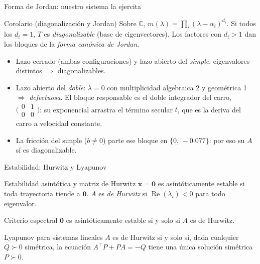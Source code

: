 \documentclass[aspectratio=169,11pt]{beamer}
\DeclareMathOperator{\Real}{Re}
\newcommand{\Cx}{\mathbb{C}}
\newcommand{\xv}{\bm{x}}
\begin{document}
\begin{frame}{Forma de Jordan: nuestro sistema la ejercita}
  \begin{cajares}{Corolario (diagonalizaci\'on y Jordan)}
    Sobre $\Cx$, $m(\lambda)=\prod_i(\lambda-\alpha_i)^{d_i}$. Si todos los
    $d_i=1$, $T$ es \emph{diagonalizable} (base de eigenvectores). Los factores
    con $d_i>1$ dan los bloques de la \emph{forma can\'onica de Jordan}.
  \end{cajares}
  \begin{itemize}
    \small
    \item Lazo cerrado (ambas configuraciones) y lazo abierto del \emph{simple}:
          eigenvalores distintos $\Rightarrow$ diagonalizables.
    \item Lazo abierto del \emph{doble}: $\lambda=0$ con multiplicidad
          algebraica 2 y geom\'etrica 1 $\Rightarrow$ \emph{defectuosa}. El bloque
          responsable es el doble integrador del carro,
          $\bigl(\begin{smallmatrix}0&1\\0&0\end{smallmatrix}\bigr)$:
          su exponencial arrastra el t\'ermino secular $t$, que es la deriva del
          carro a velocidad constante.
    \item La fricci\'on del simple ($b\neq0$) parte ese bloque en
          $\{0,\,-0.077\}$: por eso su $A$ s\'i es diagonalizable.
  \end{itemize}
\end{frame}

\begin{frame}{Estabilidad: Hurwitz y Lyapunov}
  \begin{cajadef}{Estabilidad asint\'otica y matriz de Hurwitz}
    $\xv=\bm 0$ es asint\'oticamente estable si toda trayectoria tiende a
    $\bm 0$. $A$ es \emph{de Hurwitz} si $\Real(\lambda_i)<0$ para todo
    eigenvalor.
  \end{cajadef}
  \begin{cajateo}{Criterio espectral}
    $\bm 0$ es asint\'oticamente estable si y solo si $A$ es de Hurwitz.
  \end{cajateo}
  \begin{cajateo}{Lyapunov para sistemas lineales}
    $A$ es de Hurwitz si y solo si, dada cualquier $Q\succ0$ sim\'etrica, la
    ecuaci\'on $A^\top P+PA=-Q$ tiene una \'unica soluci\'on sim\'etrica
    $P\succ0$.
  \end{cajateo}
\end{frame}
\end{document}
